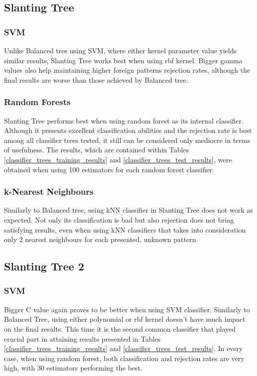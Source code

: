 \subsection{Slanting Tree}

\subsubsection{SVM}

Unlike Balanced tree using SVM, where either kernel parameter value yields similar results, Slanting Tree works best when using rbf kernel. Bigger gamma values also help maintaining higher foreign patterns rejection rates, although the final results are worse than those achieved by Balanced tree.

\subsubsection{Random Forests}

Slanting Tree performs best when using random forest as its internal classifier. Although it presents excellent classification abilities and the rejection rate is best among all classifier trees tested, it still can be considered only mediocre in terms of usefulness. The results, which are contained within Tables \ref{classifier_trees_training_results} and \ref{classifier_trees_test_results}, were obtained when using 100 estimators for each random forest classifier.

\subsubsection{k-Nearest Neighbours}

Similarly to Balanced tree, using kNN classifier in Slanting Tree does not work as expected. Not only its classification is bad but also rejection does not bring satisfying results, even when using kNN classifiers that takes into consideration only 2 nearest neighbours for each presented, unknown pattern.


\subsection{Slanting Tree 2}

\subsubsection{SVM}

Bigger C value again proves to be better when using SVM classifier. Similarly to Balanced Tree, using either polynomial or rbf kernel doesn't have much impact on the final results. This time it is the second common classifier that played crucial part in attaining results presented in Tables \ref{classifier_trees_training_results} and \ref{classifier_trees_test_results}. In every case, when using random forest, both classification and rejection rates are very high, with 30 estimators performing the best.

